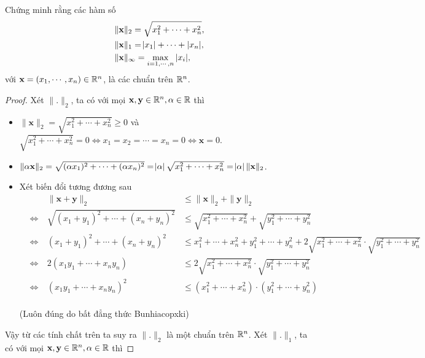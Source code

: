 \begin{exercise}{3}
    Chứng minh rằng các hàm số
    \begin{align*}
        &\|\mathbf{x}\|_2 = \sqrt{x_1^2+\cdots+x_n^2},\\
        &\|\mathbf{x}\|_1 = \abs{x_1}+\cdots+|x_n|,\\
        &\|\mathbf{x}\|_{\infty} = \max_{i = 1,\cdots,n} |x_i|,
    \end{align*}
    với $\mathbf{x} = (x_1,\cdots,x_n) \in \mathbb R^n$, là các chuẩn trên $\mathbb R^n$.
\end{exercise}

\begin{proof}
Xét $\|\mathbf{.}\|_2$, ta có với mọi $\mathbf{x}, \mathbf{y} \in \mathbb R^n, \alpha \in \mathbb R$ thì
\begin{itemize}
    \item $\|\mathbf{x}\|_2 = \sqrt{x_1^2+\cdots+x_n^2} \geq 0$
        và $\sqrt{x_1^2+\cdots+x_n^2} = 0 \Leftrightarrow x_1 = x_2 = \cdots = x_n = 0 \Leftrightarrow \mathbf{x} = 0$.
    \item $\|\mathbf{\alpha x}\|_2 = \sqrt{(\alpha x_1)^2+\cdots+(\alpha x_n)^2} = \abs{\alpha} \sqrt{x_1^2+\cdots+x_n^2} = \abs{\alpha} \|\mathbf{x}\|_2$.
    \item Xét biến đổi tương đương sau
    \begin{alignat*}{3}
        & & \|\mathbf{x} + \mathbf{y}\|_2 &\leq \|\mathbf{x}\|_2 + \|\mathbf{y}\|_2\\
        &\Leftrightarrow\ & \sqrt{(x_1+y_1)^2+\cdots+(x_n+y_n)^2} &\leq \sqrt{x_1^2+\cdots+x_n^2} + \sqrt{y_1^2+\cdots+y_n^2}\\
        &\Leftrightarrow\ & (x_1+y_1)^2+\cdots+(x_n+y_n)^2 &\leq x_1^2+\cdots+x_n^2 + y_1^2+\cdots+y_n^2 + 2\sqrt{x_1^2+\cdots+x_n^2} \cdot \sqrt{y_1^2+\cdots+y_n^2}\\
        &\Leftrightarrow\ & 2(x_1y_1+\cdots+x_ny_n) &\leq 2\sqrt{x_1^2+\cdots+x_n^2} \cdot \sqrt{y_1^2+\cdots+y_n^2}\\
        &\Leftrightarrow\ & (x_1y_1+\cdots+x_ny_n)^2 &\leq (x_1^2+\cdots+x_n^2) \cdot (y_1^2+\cdots+y_n^2)
    \end{alignat*}\\[-0.8cm]
        (Luôn đúng do bất đẳng thức Bunhiacopxki)
\end{itemize}
Vậy từ các tính chất trên ta suy ra $\|\mathbf{.}\|_2$ là một chuẩn trên $\mathbb R^n$.\QEDFill\nll
Xét $\|\mathbf{.}\|_1$, ta có với mọi $\mathbf{x}, \mathbf{y} \in \mathbb R^n, \alpha \in \mathbb R$ thì

\end{proof}
